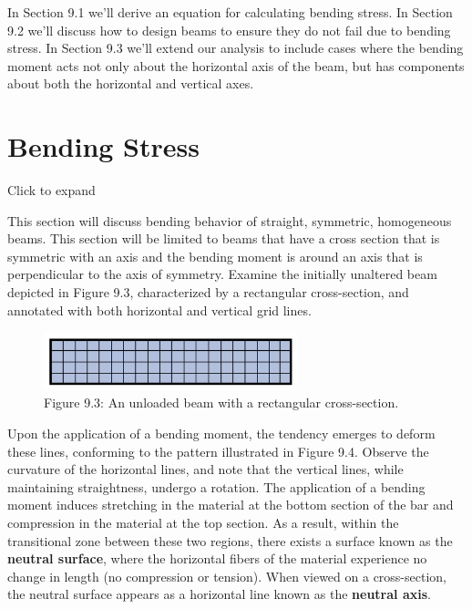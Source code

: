 \documentclass[
  letterpaper,
  DIV=11,
  numbers=noendperiod]{scrreprt}
\theoremstyle{definition}
\theoremstyle{remark}
\begin{document}
In Section 9.1 we'll derive an equation for calculating bending stress.
In Section 9.2 we'll discuss how to design beams to ensure they do not
fail due to bending stress. In Section 9.3 we'll extend our analysis to
include cases where the bending moment acts not only about the
horizontal axis of the beam, but has components about both the
horizontal and vertical axes.

\section{Bending Stress}\label{sec-9.1}

Click to expand

This section will discuss bending behavior of straight, symmetric,
homogeneous beams. This section will be limited to beams that have a
cross section that is symmetric with an axis and the bending moment is
around an axis that is perpendicular to the axis of symmetry. Examine
the initially unaltered beam depicted in Figure 9.3, characterized by a
rectangular cross-section, and annotated with both horizontal and
vertical grid lines.

\begin{figure}[H]

{\centering \includegraphics[width=2.89583in,height=\textheight]{images/CH9 PNGs/Figure 9.3.png}

}

\caption{Figure 9.3: An unloaded beam with a rectangular cross-section.}

\end{figure}%

Upon the application of a bending moment, the tendency emerges to deform
these lines, conforming to the pattern illustrated in Figure 9.4.
Observe the curvature of the horizontal lines, and note that the
vertical lines, while maintaining straightness, undergo a rotation. The
application of a bending moment induces stretching in the material at
the bottom section of the bar and compression in the material at the top
section. As a result, within the transitional zone between these two
regions, there exists a surface known as the \textbf{neutral surface},
where the horizontal fibers of the material experience no change in
length (no compression or tension). When viewed on a cross-section, the
neutral surface appears as a horizontal line known as the
\textbf{neutral axis}.
\end{document}
